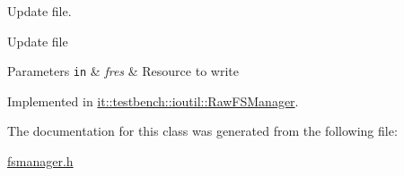 Update file. 

Update file


\begin{DoxyParams}[1]{Parameters}
\mbox{\tt in}  & {\em fres} & Resource to write \\
\hline
\end{DoxyParams}


Implemented in \hyperlink{classit_1_1testbench_1_1ioutil_1_1RawFSManager_a642d25f0c2a326c922583a0dc06474dd}{it\-::testbench\-::ioutil\-::\-Raw\-F\-S\-Manager}.



The documentation for this class was generated from the following file\-:\begin{DoxyCompactItemize}
\item 
\hyperlink{fsmanager_8h}{fsmanager.\-h}\end{DoxyCompactItemize}
